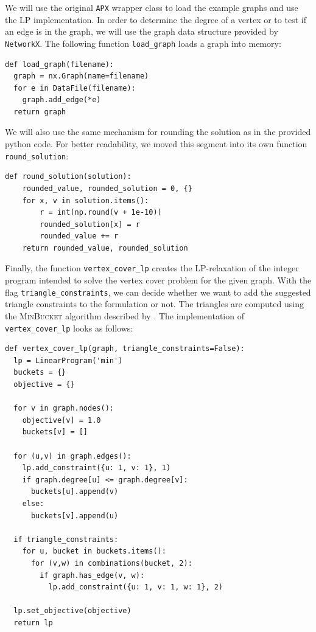 \documentclass{article}
\begin{document}
We will use the original \lstinline|APX| wrapper class to load the example graphs and use the LP implementation. In order to determine the degree of a vertex or to test if an edge is in the graph, we will use the graph data structure provided by \lstinline|NetworkX|. The following function \lstinline|load_graph| loads a graph into memory:

\begin{lstlisting}
def load_graph(filename):
  graph = nx.Graph(name=filename)
  for e in DataFile(filename):
    graph.add_edge(*e)
  return graph
\end{lstlisting}
\vspace{0.5em}

We will also use the same mechanism for rounding the solution as in the provided python code. For better readability, we moved this segment into its own function \lstinline|round_solution|:

\begin{lstlisting}
def round_solution(solution):
    rounded_value, rounded_solution = 0, {}
    for x, v in solution.items():
        r = int(np.round(v + 1e-10))
        rounded_solution[x] = r
        rounded_value += r
    return rounded_value, rounded_solution
\end{lstlisting}
\vspace{0.5em}

Finally, the function \lstinline|vertex_cover_lp| creates the LP-relaxation of the integer program intended to solve the vertex cover problem for the given graph. With the flag \lstinline|triangle_constraints|, we can decide whether we want to add the suggested triangle constraints to the formulation or not. The triangles are computed using the \textsc{MinBucket} algorithm described by \citet{Berry15}. The implementation of \lstinline|vertex_cover_lp| looks as follows:

\begin{lstlisting}
def vertex_cover_lp(graph, triangle_constraints=False):
  lp = LinearProgram('min')
  buckets = {}
  objective = {}
  
  for v in graph.nodes():
    objective[v] = 1.0
    buckets[v] = []
  
  for (u,v) in graph.edges():
    lp.add_constraint({u: 1, v: 1}, 1)
    if graph.degree[u] <= graph.degree[v]:
      buckets[u].append(v)
    else:
      buckets[v].append(u)
          
  if triangle_constraints:
    for u, bucket in buckets.items():
      for (v,w) in combinations(bucket, 2):
        if graph.has_edge(v, w):
          lp.add_constraint({u: 1, v: 1, w: 1}, 2)
      
  lp.set_objective(objective)
  return lp
\end{lstlisting}
\vspace{0.5em}
\end{document}
